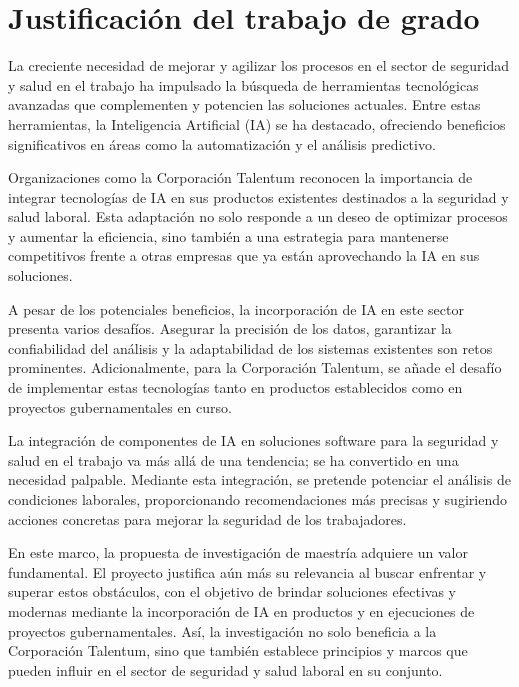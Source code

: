 \section{Justificación del trabajo de grado}
La creciente necesidad de mejorar y agilizar los procesos en el sector de seguridad y salud en el trabajo ha impulsado la búsqueda de herramientas tecnológicas avanzadas que complementen y potencien las soluciones actuales. Entre estas herramientas, la Inteligencia Artificial (IA) se ha destacado, ofreciendo beneficios significativos en áreas como la automatización y el análisis predictivo.

Organizaciones como la Corporación Talentum reconocen la importancia de integrar tecnologías de IA en sus productos existentes destinados a la seguridad y salud laboral. Esta adaptación no solo responde a un deseo de optimizar procesos y aumentar la eficiencia, sino también a una estrategia para mantenerse competitivos frente a otras empresas que ya están aprovechando la IA en sus soluciones.

A pesar de los potenciales beneficios, la incorporación de IA en este sector presenta varios desafíos. Asegurar la precisión de los datos, garantizar la confiabilidad del análisis y la adaptabilidad de los sistemas existentes son retos prominentes. Adicionalmente, para la Corporación Talentum, se añade el desafío de implementar estas tecnologías tanto en productos establecidos como en proyectos gubernamentales en curso.

La integración de componentes de IA en soluciones software para la seguridad y salud en el trabajo va más allá de una tendencia; se ha convertido en una necesidad palpable. Mediante esta integración, se pretende potenciar el análisis de condiciones laborales, proporcionando recomendaciones más precisas y sugiriendo acciones concretas para mejorar la seguridad de los trabajadores.

En este marco, la propuesta de investigación de maestría adquiere un valor fundamental. El proyecto justifica aún más su relevancia al buscar enfrentar y superar estos obstáculos, con el objetivo de brindar soluciones efectivas y modernas mediante la incorporación de IA en productos y en ejecuciones de proyectos gubernamentales. Así, la investigación no solo beneficia a la Corporación Talentum, sino que también establece principios y marcos que pueden influir en el sector de seguridad y salud laboral en su conjunto.
